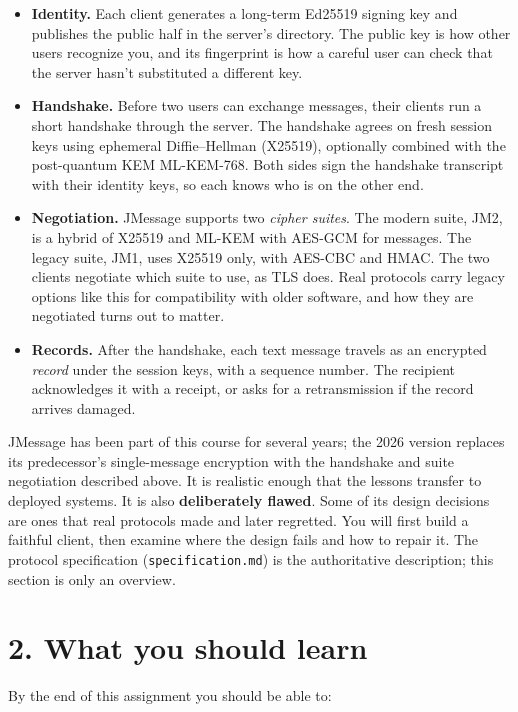 \documentclass[11pt]{article}
\newcommand{\file}[1]{\texttt{#1}}
\begin{document}
\begin{itemize}
\item \textbf{Identity.} Each client generates a long-term Ed25519 signing key and publishes the public half in the server's directory. The public key is how other users recognize you, and its fingerprint is how a careful user can check that the server hasn't substituted a different key.
\item \textbf{Handshake.} Before two users can exchange messages, their clients run a short handshake through the server. The handshake agrees on fresh session keys using ephemeral Diffie--Hellman (X25519), optionally combined with the post-quantum KEM ML-KEM-768. Both sides sign the handshake transcript with their identity keys, so each knows who is on the other end.
\item \textbf{Negotiation.} JMessage supports two \emph{cipher suites}. The modern suite, JM2, is a hybrid of X25519 and ML-KEM with AES-GCM for messages. The legacy suite, JM1, uses X25519 only, with AES-CBC and HMAC. The two clients negotiate which suite to use, as TLS does. Real protocols carry legacy options like this for compatibility with older software, and how they are negotiated turns out to matter.
\item \textbf{Records.} After the handshake, each text message travels as an encrypted \emph{record} under the session keys, with a sequence number. The recipient acknowledges it with a receipt, or asks for a retransmission if the record arrives damaged.
\end{itemize}
JMessage has been part of this course for several years; the 2026 version replaces its predecessor's single-message encryption with the handshake and suite negotiation described above. It is realistic enough that the lessons transfer to deployed systems. It is also \textbf{deliberately flawed}. Some of its design decisions are ones that real protocols made and later regretted. You will first build a faithful client, then examine where the design fails and how to repair it. The protocol specification (\file{specification.md}) is the authoritative description; this section is only an overview.

\section*{2. What you should learn}

By the end of this assignment you should be able to:
\end{document}
